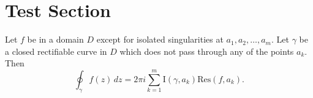 \documentclass[../main.tex]{subfiles}
\begin{document}
\section{Test Section}





\begin{theorem}
	Let $f$ be  in a domain $D$ except for isolated singularities at
	$a_1, a_2, \ldots, a_m$. Let $\gamma$ be a closed rectifiable curve in $D$
	which does not pass through any of the points $a_k$. Then
	\begin{equation*}
		\oint_\gamma f(z) \, dz = 2 \pi i \sum_{k=1}^m
		\text{I}(\gamma, a_k) \text{Res}(f, a_k).
	\end{equation*}

\end{theorem}
\end{document}
